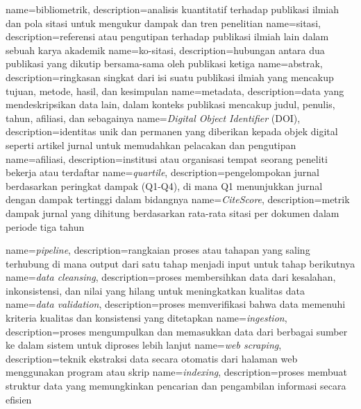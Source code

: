 {
	name={bibliometrik},
	description={analisis kuantitatif terhadap publikasi ilmiah dan pola sitasi untuk mengukur dampak dan tren penelitian}
}
{
	name={sitasi},
	description={referensi atau pengutipan terhadap publikasi ilmiah lain dalam sebuah karya akademik}
}
{
	name={ko-sitasi},
	description={hubungan antara dua publikasi yang dikutip bersama-sama oleh publikasi ketiga}
}
{
	name={abstrak},
	description={ringkasan singkat dari isi suatu publikasi ilmiah yang mencakup tujuan, metode, hasil, dan kesimpulan}
}
{
	name={metadata},
	description={data yang mendeskripsikan data lain, dalam konteks publikasi mencakup judul, penulis, tahun, afiliasi, dan sebagainya}
}
{
	name={\textit{Digital Object Identifier} (DOI)},
	description={identitas unik dan permanen yang diberikan kepada objek digital seperti artikel jurnal untuk memudahkan pelacakan dan pengutipan}
}
{
	name={afiliasi},
	description={institusi atau organisasi tempat seorang peneliti bekerja atau terdaftar}
}
{
	name={\textit{quartile}},
	description={pengelompokan jurnal berdasarkan peringkat dampak (Q1-Q4), di mana Q1 menunjukkan jurnal dengan dampak tertinggi dalam bidangnya}
}
{
	name={\textit{CiteScore}},
	description={metrik dampak jurnal yang dihitung berdasarkan rata-rata sitasi per dokumen dalam periode tiga tahun}
}

{
	name={\textit{pipeline}},
	description={rangkaian proses atau tahapan yang saling terhubung di mana output dari satu tahap menjadi input untuk tahap berikutnya}
}
{
	name={\textit{data cleansing}},
	description={proses membersihkan data dari kesalahan, inkonsistensi, dan nilai yang hilang untuk meningkatkan kualitas data}
}
{
	name={\textit{data validation}},
	description={proses memverifikasi bahwa data memenuhi kriteria kualitas dan konsistensi yang ditetapkan}
}
{
	name={\textit{ingestion}},
	description={proses mengumpulkan dan memasukkan data dari berbagai sumber ke dalam sistem untuk diproses lebih lanjut}
}
{
	name={\textit{web scraping}},
	description={teknik ekstraksi data secara otomatis dari halaman web menggunakan program atau skrip}
}
{
	name={\textit{indexing}},
	description={proses membuat struktur data yang memungkinkan pencarian dan pengambilan informasi secara efisien}
}

